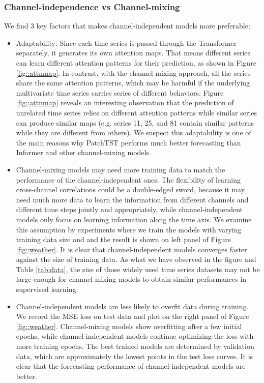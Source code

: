 \documentclass{article} \usepackage{iclr2023_conference,times}
\begin{document}
\subsubsection{Channel-independence vs Channel-mixing}
\label{sec::civsmix}

We find 3 key factors that makes channel-independent models more preferable:

\begin{itemize}[leftmargin= 20 pt,itemsep= 5 pt,topsep = 5 pt]
    \item Adaptability: Since each time series is passed through the Transformer separately, it generates its own attention maps. That means different series can learn different attention patterns for their prediction, as shown in Figure \ref{fig::attnmap}. In contrast, with the channel mixing approach, all the series share the same attention patterns, which may be harmful if the underlying multivariate time series carries series of different behaviors. Figure \ref{fig::attnmap} reveals an interesting observation that the prediction of unrelated time series relies on different attention patterns while similar series can produce similar maps (e.g. series 11, 25, and 81 contain similar patterns while they are different from others). We suspect this adaptability is one of the main reasons why PatchTST performs much better forecasting than Informer and other channel-mixing models.

    \item Channel-mixing models may need more training data to match the performance of the channel-independent ones. The flexibility of learning cross-channel correlations could be a double-edged sword, because it may need much more data to learn the information from different channels and different time steps jointly and appropriately, while channel-independent models only focus on learning information along the time axis. We examine this assumption by experiments where we train the models with varying training data size and  and the result is shown on left panel of Figure \ref{fig::weather}.  It is clear that channel-independent models converges faster against the size of training data. As what we have observed in the figure and Table \ref{tab:data}, the size of those widely used time series datasets may not be large enough for channel-mixing models to obtain similar performances in supervised learning.
    
    \item Channel-independent models are less likely to overfit data during training. We record the MSE loss on test data and plot on the right panel of Figure \ref{fig::weather}. Channel-mixing models show overfitting after a few initial epochs, while channel-independent models continue optimizing the loss with more training epochs. The best trained models are determined by validation data, which are approximately the lowest points in the test loss curves. It is clear that the forecasting performance of channel-independent models are better. 
\end{itemize}
\end{document}
